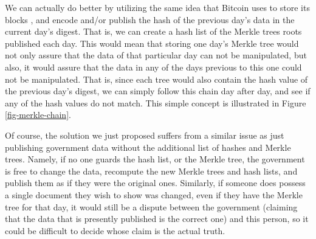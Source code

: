 We can actually do better by utilizing the same idea that Bitcoin uses to store its blocks \cite{whitepaper}, and encode and/or publish the hash of the previous day's data in the current day's digest. That is, we can create a hash list of the Merkle trees roots published each day. This would mean that storing one day's Merkle tree would not only assure that the data of that particular day can not be manipulated, but also, it would assure that the data in any of the days previous to this one could not be manipulated.  That is, since each tree would also contain the hash value of the previous day's digest, we can simply follow this chain day after day, and see if any of the hash values do not match. This simple concept is illustrated in Figure \ref{fig-merkle-chain}.


\medskip
{} Of course, the solution we just proposed suffers from a similar issue as just publishing government data without the additional list of hashes and Merkle trees. Namely, if no one guards the hash list, or the Merkle tree, the government is free to change the data, recompute the new Merkle trees and hash lists, and publish them as if they were the original ones. Similarly, if someone does possess a single document they wish to show was changed, even if they have the Merkle tree for that day, it would still be a dispute between the government (claiming that the data that is presently published is the correct one) and this person, so it could be difficult to decide whose claim is the actual truth.


